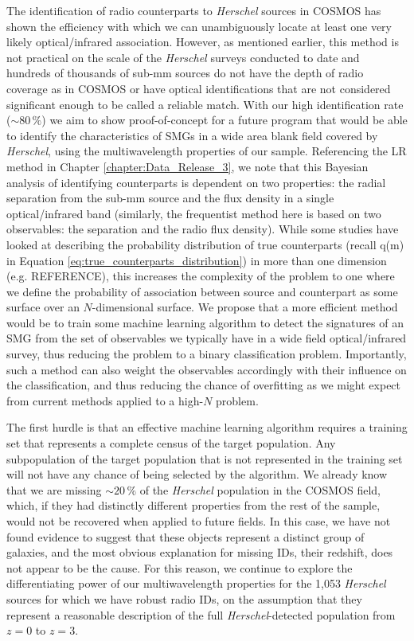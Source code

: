 The identification of radio counterparts to \textit{Herschel} sources in COSMOS has shown the efficiency with which we can unambiguously locate at least one very likely optical/infrared association. However, as mentioned earlier, this method is not practical on the scale of the \textit{Herschel} surveys conducted to date and hundreds of thousands of sub-mm sources do not have the depth of radio coverage as in COSMOS or have optical identifications that are not considered significant enough to be called a reliable match. With our high identification rate ($\sim 80\,\%$) we aim to show proof-of-concept for a future program that would be able to identify the characteristics of SMGs in a wide area blank field covered by \textit{Herschel}, using the multiwavelength properties of our sample. Referencing the LR method in Chapter \ref{chapter:Data_Release_3}, we note that this Bayesian analysis of identifying counterparts is dependent on two properties: the radial separation from the sub-mm source and the flux density in a single optical/infrared band (similarly, the frequentist method here is based on two observables: the separation and the radio flux density). While some studies have looked at describing the probability distribution of true counterparts (recall q(m) in Equation \ref{eq:true_counterparts_distribution}) in more than one dimension (e.g. {\color{red}REFERENCE}), this increases the complexity of the problem to one where we define the probability of association between source and counterpart as some surface over an $N$-dimensional surface. We propose that a more efficient method would be to train some machine learning algorithm to detect the signatures of an SMG from the set of observables we typically have in a wide field optical/infrared survey, thus reducing the problem to a binary classification problem. Importantly, such a method can also weight the observables accordingly with their influence on the classification, and thus reducing the chance of overfitting as we might expect from current methods applied to a high-$N$ problem.

The first hurdle is that an effective machine learning algorithm requires a training set that represents a complete census of the target population. Any subpopulation of the target population that is not represented in the training set will not have any chance of being selected by the algorithm. We already know that we are missing $\sim20\,\%$ of the \textit{Herschel} population in the COSMOS field, which, if they had distinctly different properties from the rest of the sample, would not be recovered when applied to future fields. In this case, we have not found evidence to suggest that these objects represent a distinct group of galaxies, and the most obvious explanation for missing IDs, their redshift, does not appear to be the cause. For this reason, we continue to explore the differentiating power of our multiwavelength properties for the 1,053 \textit{Herschel} sources for which we have robust radio IDs, on the assumption that they represent a reasonable description of the full \textit{Herschel}-detected population from $z = 0$ to $z = 3$.

